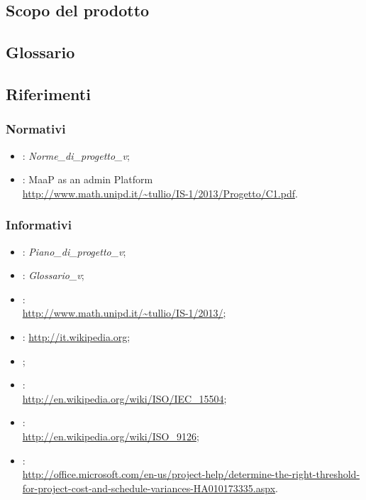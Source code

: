 \subsection{Scopo del prodotto}%
\label{1.2}
\Prodotto{}

\subsection{Glossario}%
\label{1.3}
\Glossario{}

\subsection{Riferimenti} %
\label{1.4}
\subsubsection{Normativi}
\label{1.4.1}
\begin{itemize}
\item {}: \emph{Norme\_di\_progetto\_v\versioneNormeDiProgetto{}};\\
\item {}: MaaP as an admin Platform\\
\url{http://www.math.unipd.it/~tullio/IS-1/2013/Progetto/C1.pdf}.
\end{itemize}
\subsubsection{Informativi}
\label{1.4.2}
\begin{itemize}
\item {}:  \emph{Piano\_di\_progetto\_v\versionePianoDiProgetto{}};\\
\item {}: \emph{Glossario\_v\versioneGlossario{}};\\
\item {}:
\\ \url{http://www.math.unipd.it/~tullio/IS-1/2013/};
\item {}: \url{http://it.wikipedia.org};
\item {};
\item {}:
\\ \url{http://en.wikipedia.org/wiki/ISO/IEC_15504};
\item {}:
\\ \url{http://en.wikipedia.org/wiki/ISO_9126};
\item {}: \\ \url{http://office.microsoft.com/en-us/project-help/determine-the-right-threshold-for-project-cost-and-schedule-variances-HA010173335.aspx}.
\end{itemize}


